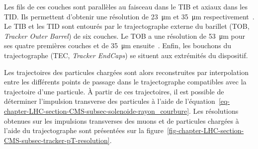 Les fils de ces couches sont parallèles au faisceau dans le TIB et axiaux dans les TID.
Ils permettent d'obtenir une résolution de \SI{23}{\micro\meter} et \SI{35}{\micro\meter} respectivement~\cite{cms_paper}.
Le TIB et les TID sont entourés par le trajectographe externe du barillet (TOB, \emph{Tracker Outer Barrel}) de six couches.
Le TOB a une résolution de \SI{53}{\micro\meter} pour ses quatre premières couches et de \SI{35}{\micro\meter} ensuite~\cite{cms_paper}.
Enfin, les bouchons du trajectographe (TEC, \emph{Tracker EndCaps}) se situent aux extrémités du dispositif.
\par Les trajectoires des particules chargées sont alors reconstruites par interpolation entre les différents points de passage dans le trajectographe compatibles avec la trajectoire d'une particule.
À partir de ces trajectoires, il est possible de déterminer l'impulsion transverse des particules à l'aide de l'équation~\eqref{eq-chapter-LHC-section-CMS-subsec-solenoide-rayon_courbure}.
Les résolutions obtenues sur les impulsions transverses des muons et de particules chargées à l'aide du trajectographe sont présentées sur la figure~\ref{fig-chapter-LHC-section-CMS-subsec-tracker-pT-resolution}.
